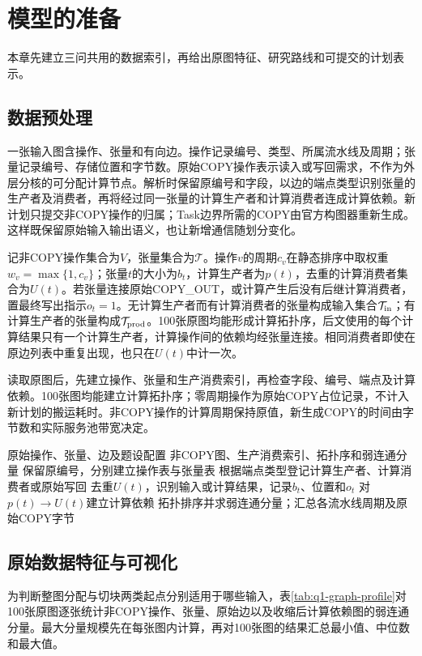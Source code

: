 \section{模型的准备}
本章先建立三问共用的数据索引，再给出原图特征、研究路线和可提交的计划表示。

\subsection{数据预处理}
一张输入图含操作、张量和有向边。操作记录编号、类型、所属流水线及周期；张量记录编号、存储位置和字节数。原始COPY操作表示读入或写回需求，不作为外层分核的可分配计算节点。解析时保留原编号和字段，以边的端点类型识别张量的生产者及消费者，再将经过同一张量的计算生产者和计算消费者连成计算依赖。新计划只提交非COPY操作的归属；Task边界所需的COPY由官方构图器重新生成。这样既保留原始输入输出语义，也让新增通信随划分变化。

记非COPY操作集合为$V$，张量集合为$\mathcal T$。操作$v$的周期$c_v$在静态排序中取权重$w_v=\max\{1,c_v\}$；张量$t$的大小为$b_t$，计算生产者为$p(t)$，去重的计算消费者集合为$U(t)$。若张量连接原始COPY\_OUT，或计算产生后没有后继计算消费者，置最终写出指示$o_t=1$。无计算生产者而有计算消费者的张量构成输入集合$\mathcal T_{\rm in}$；有计算生产者的张量构成$\mathcal T_{\rm prod}$。100张原图均能形成计算拓扑序，后文使用的每个计算结果只有一个计算生产者，计算操作间的依赖均经张量连接。相同消费者即使在原边列表中重复出现，也只在$U(t)$中计一次。

读取原图后，先建立操作、张量和生产消费索引，再检查字段、编号、端点及计算依赖。100张图均能建立计算拓扑序；零周期操作为原始COPY占位记录，不计入新计划的搬运耗时。非COPY操作的计算周期保持原值，新生成COPY的时间由字节数和实际服务池带宽决定。

\begin{algorithm}[H]\caption{计算依赖和张量接收域的预处理}
\begin{algorithmic}[1]
\REQUIRE 原始操作、张量、边及题设配置
\ENSURE 非COPY图、生产消费索引、拓扑序和弱连通分量
\STATE 保留原编号，分别建立操作表与张量表
\STATE 根据端点类型登记计算生产者、计算消费者或原始写回
\ENDFOR
{}
\STATE 去重$U(t)$，识别输入或计算结果，记录$b_t$、位置和$o_t$
\STATE 对$p(t)\to U(t)$建立计算依赖
\ENDFOR
\STATE 拓扑排序并求弱连通分量；汇总各流水线周期及原始COPY字节
\end{algorithmic}\end{algorithm}

\subsection{原始数据特征与可视化}
为判断整图分配与切块两类起点分别适用于哪些输入，表\ref{tab:q1-graph-profile}对100张原图逐张统计非COPY操作、张量、原始边以及收缩后计算依赖图的弱连通分量。最大分量规模先在每张图内计算，再对100张图的结果汇总最小值、中位数和最大值。


